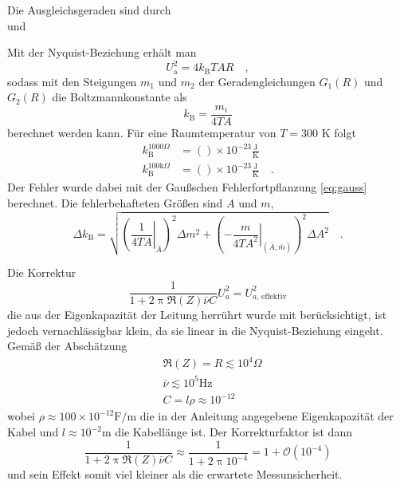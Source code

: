 		Die Ausgleichsgeraden sind durch
		\begin{equation}
			
		\end{equation}
		und
		\begin{equation}
			
		\end{equation}

		Mit der Nyquist-Beziehung erhält man
		\begin{equation}
			U_\text{a}^2 =4k_\text{B}T A R \quad ,
		\end{equation}
		sodass mit den Steigungen $m_1$ und $m_2$ der Geradengleichungen $G_1(R)$ und $G_2(R)$
		die Boltzmannkonstante als
		\begin{equation}
		k_\text{B}=\frac{m_i}{4 T A}
		\end{equation}
		berechnet werden kann. Für eine Raumtemperatur von $T= 300$ K folgt
		\begin{align}
          k_\text{B}^{1000\Omega}			&=  ()\times 10^{-23}\frac{\text{J}}
																			{\text{K}}  \\
                                                                            k_\text{B}^{100\text{k}\Omega}	&=  ()\times 10^{-23}\frac{\text{J}}
																			{\text{K}} \quad .
		\end{align}
		Der Fehler wurde dabei mit der Gaußschen Fehlerfortpflanzung \eqref{eq:gauss}
		berechnet. Die fehlerbehafteten Größen sind $A$ und $m$,
		\begin{equation}
		\Delta k_\text{B}=\sqrt{
		\left(\left. \frac{1}{4 T A} \right|_{\bar{A}}\right)^2 \Delta m^2
		+
		\left(\left. -\frac{m}{4 T A^2} \right|_{(\bar{A},\bar{m})}\right)^2 \Delta A^2
		} \quad .
		\end{equation}

		Die Korrektur
		\begin{equation}
		\frac{1}{1+2 \uppi \Re(Z) \bar{\nu} C} U_a^2 = U_{a\text{, effektiv}}^2
		\end{equation}
		die aus der Eigenkapazität der Leitung herrührt wurde mit berücksichtigt, ist
		jedoch vernachlässigbar klein, da
		sie linear in die Nyquist-Beziehung eingeht. Gemäß der Abschätzung
		\begin{align}
		&\Re(Z) = R  \lesssim  10^4 \Omega \\
		&\bar{\nu}  \lesssim 10^5 \text{Hz} \\
		&C = l \rho  \approx 10^{-12}
		\end{align}
		wobei $\rho\approx 100 \times 10^{-12} \text{F}/\text{m}$ die in
		der Anleitung angegebene Eigenkapazität der Kabel
		und $l\approx 10^{-2}$m die Kabellänge ist. Der Korrekturfaktor ist dann
		\begin{equation}
		\frac{1}{1+2 \uppi \Re(Z) \bar{\nu} C} \approx
		\frac{1}{1+2\uppi 10^{-4}}=1+ \mathcal{O}(10^{-4})
		\end{equation}
		und sein Effekt somit viel kleiner als die erwartete Messunsicherheit.

